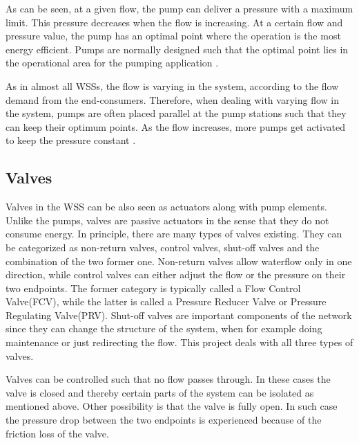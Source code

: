 %  

As can be seen, at a given flow, the pump can deliver a pressure with a maximum limit. This pressure decreases when the flow is increasing. At a certain flow and pressure value, the pump has an optimal point where the operation is the most energy efficient. Pumps are normally designed such that the optimal point lies in the operational area for the pumping application \cite{kenneth_houe}. 

As in almost all WSSs, the flow is varying in the system, according to the flow demand from the end-consumers. Therefore, when dealing with varying flow in the system, pumps are often placed parallel at the pump stations such that they can keep their optimum points. As the flow increases, more pumps get activated to keep the pressure constant \cite{kenneth_houe}. 

\subsection{Valves}
\label{valves}

Valves in the WSS can be also seen as actuators along with pump elements. Unlike the pumps, valves are passive actuators in the sense that they do not consume energy. In principle, there are many types of valves existing. They can be categorized as non-return valves, control valves, shut-off valves and the combination of the two former one. Non-return valves allow waterflow only in one direction, while control valves can either adjust the flow or the pressure on their two endpoints. The former category is typically called a Flow Control Valve(FCV), while the latter is called a Pressure Reducer Valve or Pressure Regulating Valve(PRV). Shut-off valves are important components of the network since they can change the structure of the system, when for example doing maintenance or just redirecting the flow. This project deals with all three types of valves. 

Valves can be controlled such that no flow passes through. In these cases the valve is closed and thereby certain parts of the system can be isolated as mentioned above. Other possibility is that the valve is fully open. In such case the pressure drop between the two endpoints is experienced because of the friction loss of the valve. 

